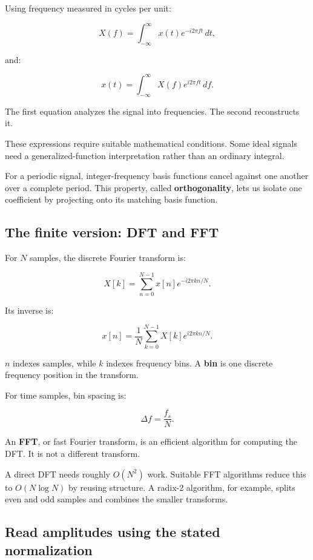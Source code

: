 Using frequency measured in cycles per unit:

\[
X(f)=\int_{-\infty}^{\infty}x(t)e^{-i2\pi ft}\,dt,
\]

and:

\[
x(t)=\int_{-\infty}^{\infty}X(f)e^{i2\pi ft}\,df.
\]

The first equation analyzes the signal into frequencies. The second reconstructs it.

These expressions require suitable mathematical conditions. Some ideal signals need a generalized-function interpretation rather than an ordinary integral.

For a periodic signal, integer-frequency basis functions cancel against one another over a complete period. This property, called \textbf{orthogonality}, lets us isolate one coefficient by projecting onto its matching basis function.

\subsection{The finite version: DFT and FFT}\label{04-visual-computing-ii-ch043-the-finite-version-dft-and-fft}

For \(N\) samples, the discrete Fourier transform is:

\[
X[k]=\sum_{n=0}^{N-1}x[n]e^{-i2\pi kn/N}.
\]

Its inverse is:

\[
x[n]=\frac1N\sum_{k=0}^{N-1}X[k]e^{i2\pi kn/N}.
\]

\(n\) indexes samples, while \(k\) indexes frequency bins. A \textbf{bin} is one discrete frequency position in the transform.

For time samples, bin spacing is:

\[
\Delta f=\frac{f_s}{N}.
\]

An \textbf{FFT}, or fast Fourier transform, is an efficient algorithm for computing the DFT. It is not a different transform.

A direct DFT needs roughly \(O(N^2)\) work. Suitable FFT algorithms reduce this to \(O(N\log N)\) by reusing structure. A radix-2 algorithm, for example, splits even and odd samples and combines the smaller transforms.

\subsection{Read amplitudes using the stated normalization}\label{04-visual-computing-ii-ch043-read-amplitudes-using-the-stated-normalization}

